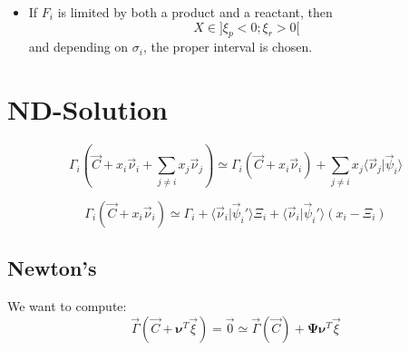 \documentclass[aps,12pt]{revtex4}
\begin{document}
\begin{itemize}
\begin{itemize}
	\item If $F_i$ is limited by both a product and a reactant, then $$X\in\rbrack \xi_p < 0 ; \xi_r > 0 \lbrack$$
	and depending on $\sigma_i$, the proper interval is chosen.
	\end{itemize}
	
\end{itemize}

\section{ND-Solution} 	

\begin{equation}
	\Gamma_i\left(\vec{C} + x_i \vec{\nu}_i + \sum_{j\not=i} x_j \vec{\nu}_j \right) 
	\simeq 
	\Gamma_i(\vec{C} + x_i \vec{\nu}_i) + \sum_{j\not=i} x_j \langle \vec{\nu}_j \vert \vec{\psi}_i \rangle
\end{equation}

\begin{equation}
	\Gamma_i(\vec{C} + x_i \vec{\nu}_i) \simeq \Gamma_i +  \langle \vec{\nu}_i \vert \vec{\psi}_i' \rangle \Xi_i + \langle \vec{\nu}_i \vert \vec{\psi}_i' \rangle \left( x_i - \Xi_i \right)
\end{equation}

\subsection{Newton's}
We want to compute:
\begin{equation}
	\vec{\Gamma} (\vec{C}+\bm{\nu}^T \vec{\xi}) = \vec{0} \simeq \vec{\Gamma}(\vec{C}) + \bm{\Psi} \bm{\nu}^T \vec{\xi}
\end{equation}


 	
 	 
 
\end{document}
